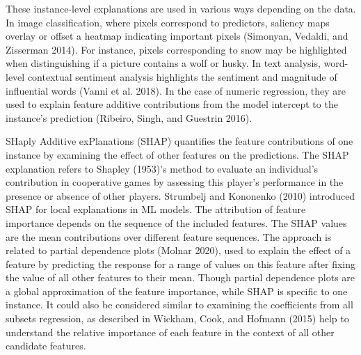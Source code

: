 \documentclass[11pt,twoside]{article}
\begin{document}
These instance-level explanations are used in various ways depending on the data. In image classification, where pixels correspond to predictors, saliency maps overlay or offset a heatmap indicating important pixels (Simonyan, Vedaldi, and Zisserman 2014). For instance, pixels corresponding to snow may be highlighted when distinguishing if a picture contains a wolf or husky. In text analysis, word-level contextual sentiment analysis highlights the sentiment and magnitude of influential words (Vanni et al. 2018). In the case of numeric regression, they are used to explain feature additive contributions from the model intercept to the instance's prediction (Ribeiro, Singh, and Guestrin 2016).

SHaply Additive exPlanations (SHAP) quantifies the feature contributions of one instance by examining the effect of other features on the predictions. The SHAP explanation refers to Shapley (1953)'s method to evaluate an individual's contribution in cooperative games by assessing this player's performance in the presence or absence of other players. Strumbelj and Kononenko (2010) introduced SHAP for local explanations in ML models. The attribution of feature importance depends on the sequence of the included features. The SHAP values are the mean contributions over different feature sequences. The approach is related to partial dependence plots (Molnar 2020), used to explain the effect of a feature by predicting the response for a range of values on this feature after fixing the value of all other features to their mean. Though partial dependence plots are a global approximation of the feature importance, while SHAP is specific to one instance. It could also be considered similar to examining the coefficients from all subsets regression, as described in Wickham, Cook, and Hofmann (2015) help to understand the relative importance of each feature in the context of all other candidate features.
\end{document}

